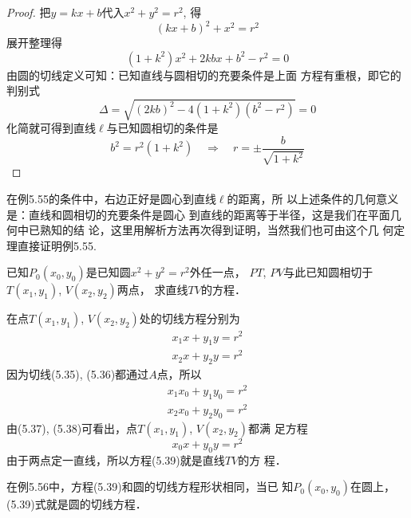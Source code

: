\begin{proof}
    把$y=kx+b$代入$x^2+y^2=r^2$, 得
\[(kx+b)^2+x^2=r^2\]
展开整理得
\[(1+k^2)x^2+2kbx+b^2-r^2=0\]
由圆的切线定义可知：已知直线与圆相切的充要条件是上面
方程有重根，即它的判别式
\[\Delta=\sqrt{(2kb)^2-4(1+k^2)(b^2-r^2)}=0\]
化简就可得到直线$\ell$与已知圆相切的条件是
\[
    b^2=r^2(1+k^2)\quad \Rightarrow\quad   r=\pm\frac{b}{\sqrt{1+k^2}}
\]
\end{proof}

在例5.55的条件中，右边正好是圆心到直线$\ell$的距离，所
以上述条件的几何意义是：直线和圆相切的充要条件是圆心
到直线的距离等于半径，这是我们在平面几何中已熟知的结
论，这里用解析方法再次得到证明，当然我们也可由这个几
何定理直接证明例5.55.

\begin{example}
    已知$P_0(x_0,y_0)$是已知圆$x^2+y^2=r^2$外任一点，
$PT$, $PV$与此已知圆相切于$T(x_1,y_1)$, $V(x_2,y_2)$两点，
求直线$TV$的方程．
\end{example}


\begin{solution}
    在点$T(x_1,y_1)$, $V(x_2,y_2)$处的切线方程分别为
\begin{align}
    x_1x+y_1y=r^2\\
    x_2x+y_2y=r^2
\end{align}
因为切线(5.35), (5.36)都通过$A$点，所以
\begin{align}
    x_1x_0+y_1y_0=r^2\\
    x_2x_0+y_2y_0=r^2
\end{align}
由(5.37), (5.38)可看出，点$T(x_1,y_1)$, $V(x_2,y_2)$都满
足方程
\begin{equation}
    x_0x+y_0y=r^2
\end{equation}
由于两点定一直线，所以方程(5.39)就是直线$TV$的方
程．
\end{solution}


在例5.56中，方程(5.39)和圆的切线方程形状相同，当已
知$P_0(x_0,y_0)$在圆上，(5.39)式就是圆的切线方程．

